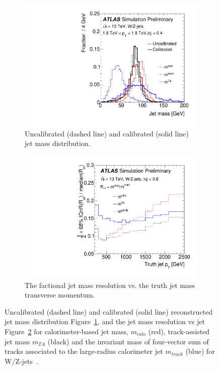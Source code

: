 \begin{figure}[htbp!]
  \centering
  \captionsetup{justification=centering}
	\hspace{-2cm}
    \begin{subfigure}[b]{0.45\textwidth}
        \includegraphics[width=\textwidth,angle=-90]{figures/object/Jet_mass}
        \caption{Uncalibrated (dashed line) and calibrated (solid line) jet mass distribution.}
        \label{fig:obj_jet_mass_dist}
    \end{subfigure}
    \quad
    \begin{subfigure}[b]{0.45\textwidth}
        \includegraphics[width=\textwidth,angle=-90]{figures/object/Jet_mass_resolution}
        \caption{The factional jet mass resolution vs.  the truth jet mass transverse momentum.}
        \label{fig:obj_jet_mass_resolution}
    \end{subfigure}
   \caption{Uncalibrated (dashed line) and calibrated (solid line) reconstructed jet mass distribution Figure~\ref{fig:obj_jet_mass_dist}, and the jet mass resolution vs jet \pt~ Figure~\ref{fig:obj_jet_mass_resolution} for calorimeter-based jet mass, $m_{calo}$ (red), track-assisted jet mass $m_{TA}$ (black) and the invariant mass of four-vector sum of tracks associated to the large-radius calorimeter jet $m_{track}$ (blue) for W/Z-jets~\cite{ATLAS-CONF-2016-035}.}
  \label{fig:obj_jet_mass}
\end{figure}

